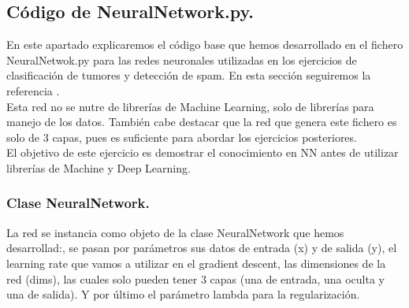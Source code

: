 \documentclass[a4paper,11pt]{article}
\begin{document}
\subsection{Código de NeuralNetwork.py.}
En este apartado explicaremos el código base que hemos desarrollado en el fichero NeuralNetwok.py para las redes neuronales utilizadas en los ejercicios de clasificación de tumores y detección de spam. En esta sección seguiremos la referencia \cite{redes}.\\

\noindent
 Esta red no se nutre de librerías de Machine Learning, solo de librerías para manejo de los datos. También cabe destacar que la red que genera este fichero es solo de 3 capas, pues es suficiente para abordar los ejercicios posteriores.\\

\noindent
 El objetivo de este ejercicio es demostrar el conocimiento en NN antes de utilizar librerías de Machine y Deep Learning.
\subsubsection{Clase NeuralNetwork.}

La red se instancia como objeto de la clase NeuralNetwork que hemos desarrollad:, se pasan por parámetros sus datos de entrada (x) y de salida (y), el learning rate que vamos a utilizar en el gradient descent, las dimensiones de la red (dims), las cuales solo pueden tener 3 capas (una de entrada, una oculta y una de salida). Y por último el parámetro lambda para la regularización.
\\
\end{document}
